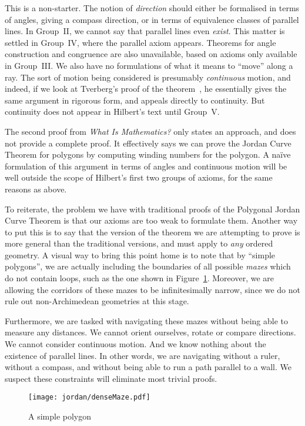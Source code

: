 This is a non-starter. The notion of \emph{direction} should either be formalised in terms of angles, giving a compass direction, or in terms of equivalence classes of parallel lines. In Group~II, we cannot say that parallel lines even \emph{exist}. This matter is settled in Group~IV, where the parallel axiom appears. Theorems for angle construction and congruence are also unavailable, based on axioms only available in Group~III. We also have no formulations of what it means to ``move'' along a ray. The sort of motion being considered is presumably \emph{continuous} motion, and indeed, if we look at Tverberg's proof of the theorem~\cite{TverbergJordan}, he essentially gives the same argument in rigorous form, and appeals directly to continuity. But  continuity does not appear in Hilbert's text until Group~V. 

The second proof from \emph{What Is Mathematics?} only states an approach, and does not provide a complete proof. It effectively says we can prove the Jordan Curve Theorem for polygons by computing winding numbers for the polygon. A na\"{i}ve formulation of this argument in terms of angles and continuous motion will be well outside the scope of Hilbert's first two groups of axioms, for the same reasons as above. 

To reiterate, the problem we have with traditional proofs of the Polygonal Jordan Curve Theorem is that our axioms are too weak to formulate them. Another way to put this is to say that the version of the theorem we are attempting to prove is more general than the traditional versions, and must apply to \emph{any} ordered geometry. A visual way to bring this point home is to note that by ``simple polygons'', we are actually including the boundaries of all possible \emph{mazes} which do not contain loops, such as the one shown in Figure~\ref{fig:SimplePolygon}. Moreover, we are allowing the corridors of these mazes to be infinitesimally narrow, since we do not rule out non-Archimedean geometries at this stage.

Furthermore, we are tasked with navigating these mazes without being able to measure any distances. We cannot orient ourselves, rotate or compare directions. We cannot consider continuous motion. And we know nothing about the existence of parallel lines. In other words, we are navigating without a ruler, without a compass, and without being able to run a path parallel to a wall. We suspect these constraints will eliminate most trivial proofs.

\begin{figure}
\centering
\texttt{[image: jordan/denseMaze.pdf]}
\caption{A simple polygon}
\label{fig:SimplePolygon}
\end{figure}

